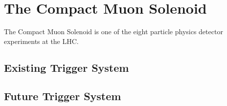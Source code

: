 
\chapter{The Compact Muon Solenoid}
The Compact Muon Solenoid is one of the eight particle physics detector experiments at the LHC.

\section{Existing Trigger System}

\section{Future Trigger System}
